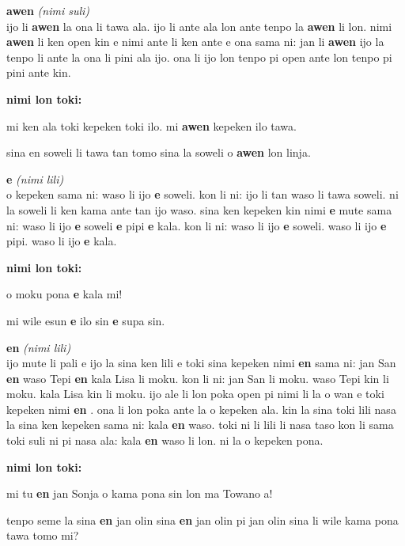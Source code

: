 \documentclass[a4paper,11pt]{book}
\newenvironment{definition}[2]{ %
  \begin{description}
  \item
    {\huge \textbf{#1}}
    {\Large \textit{(#2)}} \\
}{
  \end{description}%
}
\newenvironment{example}{ %
  \item
  \textbf{nimi lon toki:}
  
  \hfill
  \begin{minipage}{\dimexpr\textwidth-1cm}
  \begin{itshape}
}
{
  \end{itshape}
  \end{minipage}
}
\newcommand{\inex}[1]{%
  \textbf{#1}%
}
\begin{document}
\begin{definition}{awen}{nimi suli}
  ijo li \inex{awen} la ona li tawa ala. ijo li ante ala lon ante tenpo la \inex{awen} li lon. nimi \inex{awen} li ken open kin e nimi ante li ken ante e ona sama ni: jan li \inex{awen} ijo la tenpo li ante la ona li pini ala ijo. ona li ijo lon tenpo pi open ante lon tenpo pi pini ante kin.
  \begin{example}
    mi ken ala toki kepeken toki ilo. mi \inex{awen} kepeken ilo tawa.
    
    sina en soweli li tawa tan tomo sina la soweli o \inex{awen} lon linja.
  \end{example}
\end{definition}

\begin{definition}{e}{nimi lili}
  o kepeken sama ni: waso li ijo \inex{e} soweli. kon li ni: ijo li tan waso li tawa soweli. ni la soweli li ken kama ante tan ijo waso. sina ken kepeken kin nimi \inex{e} mute sama ni: waso li ijo \inex{e} soweli \inex{e} pipi \inex{e} kala. kon li ni: waso li ijo \inex{e} soweli. waso li ijo \inex{e} pipi. waso li ijo \inex{e} kala.
  \begin{example}
    o moku pona \inex{e} kala mi!
    
    mi wile esun \inex{e} ilo sin \inex{e} supa sin.
  \end{example}
\end{definition}

\begin{definition}{en}{nimi lili}
  ijo mute li pali e ijo la sina ken lili e toki sina kepeken nimi \inex{en} sama ni: jan San \inex{en} waso Tepi \inex{en} kala Lisa li moku. kon li ni: jan San li moku. waso Tepi kin li moku. kala Lisa kin li moku. ijo ale li lon poka open pi nimi li la o wan e toki kepeken nimi \inex{en}. ona li lon poka ante la o kepeken ala. kin la sina toki lili nasa la sina ken kepeken sama ni: kala \inex{en} waso. toki ni li lili li nasa taso kon li sama toki suli ni pi nasa ala: kala \inex{en} waso li lon. ni la o kepeken pona.
  \begin{example}
    mi tu \inex{en} jan Sonja o kama pona sin lon ma Towano a!
    
    tenpo seme la sina \inex{en} jan olin sina \inex{en} jan olin pi jan olin sina li wile kama pona tawa tomo mi?
  \end{example}
\end{definition}

\pagebreak
\end{document}
